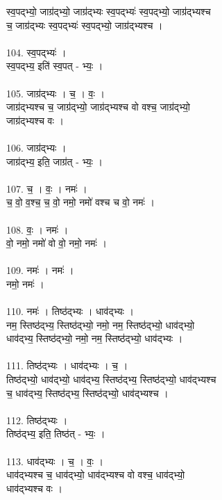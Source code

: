 स्व॒पद्भ्यो॒ जाग्र॑द्भ्यो॒ जाग्र॑द्भ्यः स्व॒पद्भ्यः॑ स्व॒पद्भ्यो॒ जाग्र॑द्भ्यश्च\\
च॒ जाग्र॑द्भ्यः स्व॒पद्भ्यः॑ स्व॒पद्भ्यो॒ जाग्र॑द्भ्यश्च ।\\
\\
104. स्व॒पद्भ्यः॑ ।\\
स्व॒पद्भ्य॒ इति॑ स्व॒पत् - भ्यः॒ ।\\
\\
105. जाग्र॑द्भ्यः । च॒ । वः॒ ।\\
जाग्र॑द्भ्यश्च च॒ जाग्र॑द्भ्यो॒ जाग्र॑द्भ्यश्च वो वश्च॒ जाग्र॑द्भ्यो॒\\
जाग्र॑द्भ्यश्च वः ।\\
\\
106. जाग्र॑द्भ्यः ।\\
जाग्र॑द्भ्य॒ इति॒ जाग्र॑त् - भ्यः॒ ।\\
\\
107. च॒ । वः॒ । नमः॑ ।\\
च॒ वो॒ व॒श्च॒ च॒ वो॒ नमो॒ नमो॑ वश्च च वो॒ नमः॑ ।\\
\\
108. वः॒ । नमः॑ ।\\
वो॒ नमो॒ नमो॑ वो वो॒ नमो॒ नमः॑ ।\\
\\
109. नमः॑ । नमः॑ ।\\
नमो॒ नमः॑ ।\\
\\
110. नमः॑ । तिष्ठ॑द्भ्यः । धाव॑द्भ्यः ।\\
नम॒ स्तिष्ठ॑द्भ्य॒ स्तिष्ठ॑द्भ्यो॒ नमो॒ नम॒ स्तिष्ठ॑द्भ्यो॒ धाव॑द्भ्यो॒\\
धाव॑द्भ्य॒ स्तिष्ठ॑द्भ्यो॒ नमो॒ नम॒ स्तिष्ठ॑द्भ्यो॒ धाव॑द्भ्यः ।\\
\\
111. तिष्ठ॑द्भ्यः । धाव॑द्भ्यः । च॒ ।\\
तिष्ठ॑द्भ्यो॒ धाव॑द्भ्यो॒ धाव॑द्भ्य॒ स्तिष्ठ॑द्भ्य॒ स्तिष्ठ॑द्भ्यो॒ धाव॑द्भ्यश्च\\
च॒ धाव॑द्भ्य॒ स्तिष्ठ॑द्भ्य॒ स्तिष्ठ॑द्भ्यो॒ धाव॑द्भ्यश्च ।\\
\\
112. तिष्ठ॑द्भ्यः ।\\
तिष्ठ॑द्भ्य॒ इति॒ तिष्ठ॑त् - भ्यः॒ ।\\
\\
113. धाव॑द्भ्यः । च॒ । वः॒ ।\\
धाव॑द्भ्यश्च च॒ धाव॑द्भ्यो॒ धाव॑द्भ्यश्च वो वश्च॒ धाव॑द्भ्यो॒\\
धाव॑द्भ्यश्च वः ।\\
\\
